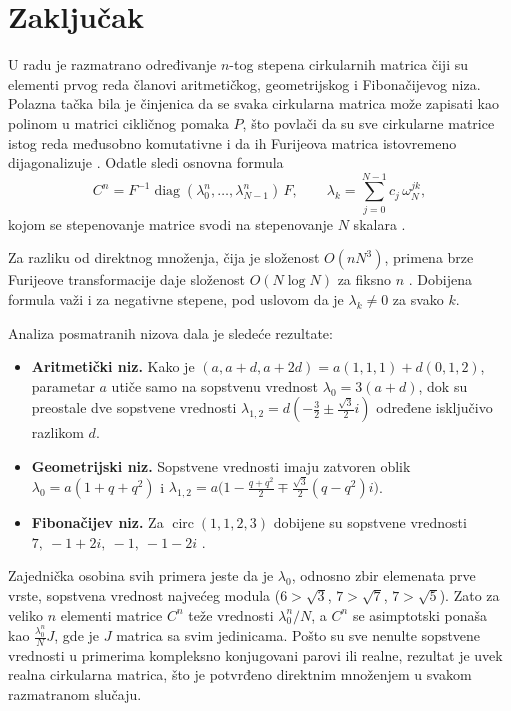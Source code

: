 \documentclass[12pt,a4paper]{report}
\begin{document}
\chapter{Zaključak}

U radu je razmatrano određivanje $n$-tog stepena cirkularnih matrica čiji su
elementi prvog reda članovi aritmetičkog, geometrijskog i Fibonačijevog niza.
Polazna tačka bila je činjenica da se svaka cirkularna matrica može zapisati
kao polinom u matrici cikličnog pomaka $P$, što povlači da su sve cirkularne
matrice istog reda međusobno komutativne i da ih Furijeova matrica
istovremeno dijagonalizuje \cite{davis, gray}. Odatle sledi osnovna formula
\[
C^n = F^{-1}\operatorname{diag}(\lambda_0^n,\dots,\lambda_{N-1}^n)\,F,
\qquad
\lambda_k=\sum_{j=0}^{N-1}c_j\,\omega_N^{jk},
\]
kojom se stepenovanje matrice svodi na stepenovanje $N$ skalara \cite{horn, meyer}.

Za razliku od direktnog množenja, čija je složenost $O(nN^3)$, primena brze
Furijeove transformacije daje složenost $O(N\log N)$ za fiksno $n$
\cite{gray}. Dobijena formula važi i za negativne stepene, pod uslovom da je
$\lambda_k\neq 0$ za svako $k$.

Analiza posmatranih nizova dala je sledeće rezultate:
\begin{itemize}
	\item \textbf{Aritmetički niz.} Kako je $(a,a+d,a+2d)=a(1,1,1)+d(0,1,2)$,
	parametar $a$ utiče samo na sopstvenu vrednost $\lambda_0=3(a+d)$, dok su
	preostale dve sopstvene vrednosti
	$\lambda_{1,2}=d\left(-\tfrac32\pm\tfrac{\sqrt3}{2}i\right)$
	određene isključivo razlikom $d$.
	\item \textbf{Geometrijski niz.} Sopstvene vrednosti imaju zatvoren oblik
	$\lambda_0=a(1+q+q^2)$ i
	$\lambda_{1,2}=a\bigl(1-\tfrac{q+q^2}{2}\mp\tfrac{\sqrt3}{2}(q-q^2)i\bigr)$.
	\item \textbf{Fibonačijev niz.} Za $\operatorname{circ}(1,1,2,3)$ dobijene su
	sopstvene vrednosti $7,\ -1+2i,\ -1,\ -1-2i$ \cite{koshy}.
\end{itemize}

Zajednička osobina svih primera jeste da je $\lambda_0$, odnosno zbir
elemenata prve vrste, sopstvena vrednost najvećeg modula
($6>\sqrt3$, $7>\sqrt7$, $7>\sqrt5$). Zato za veliko $n$ elementi matrice
$C^n$ teže vrednosti $\lambda_0^n/N$, a $C^n$ se asimptotski ponaša kao
$\tfrac{\lambda_0^n}{N}J$, gde je $J$ matrica sa svim jedinicama. Pošto su
sve nenulte sopstvene vrednosti u primerima kompleksno konjugovani parovi
ili realne, rezultat je uvek realna cirkularna matrica, što je potvrđeno
direktnim množenjem u svakom razmatranom slučaju.
\end{document}
